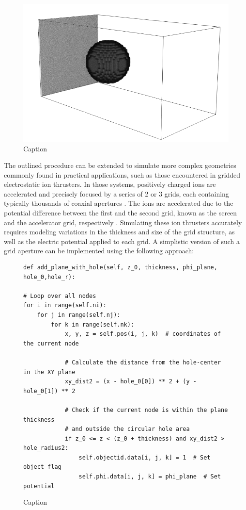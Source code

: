 \begin{figure}[H]
    \centering
\includegraphics[width=0.7\linewidth]{figures/sphere_paraview.png}    
    \caption{Caption}
    \label{fig: Sphere simulation domain}
\end{figure}

The outlined procedure can be extended to simulate more complex geometries commonly found in practical applications, such as those encountered in gridded electrostatic ion thrusters. In those systems, positively charged ions are accelerated and precisely focused by a series of 2 or 3 grids, each containing typically thousands of coaxial apertures \cite{noauthor_gridded_nodate}. The ions are accelerated due to the potential difference between the first and the second grid, known as the screen and the accelerator grid, respectively \cite{foster_review_2024}. Simulating these ion thrusters accurately requires modeling variations in the thickness and size of the grid structure, as well as the electric potential applied to each grid. A simplistic version of such a grid aperture can be implemented using the following approach:
\begin{figure}[H]
    \centering
    \begin{lstlisting}
def add_plane_with_hole(self, z_0, thickness, phi_plane, hole_0,hole_r):

# Loop over all nodes
for i in range(self.ni):
    for j in range(self.nj):
        for k in range(self.nk):
            x, y, z = self.pos(i, j, k)  # coordinates of the current node
            
            # Calculate the distance from the hole-center in the XY plane
            xy_dist2 = (x - hole_0[0]) ** 2 + (y - hole_0[1]) ** 2
            
            # Check if the current node is within the plane thickness
            # and outside the circular hole area
            if z_0 <= z < (z_0 + thickness) and xy_dist2 > hole_radius2:
                self.objectid.data[i, j, k] = 1  # Set object flag
                self.phi.data[i, j, k] = phi_plane  # Set potential
    \end{lstlisting}
    \caption{Caption}
    \label{fig:enter-label}
\end{figure}

